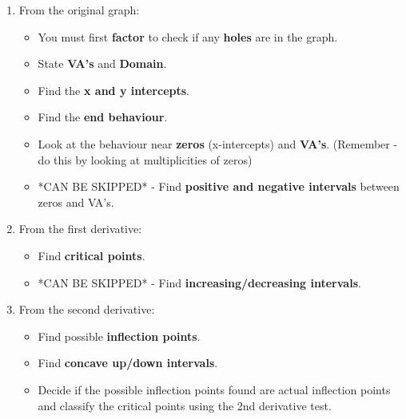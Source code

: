 \documentclass[12pt,fleqn]{book} %
\begin{document}
\begin{enumerate}
    \item From the original graph:
          \begin{itemize}
              \item You must first \textbf{factor} to check if any \textbf{holes} are in the graph.
              \item State \textbf{VA's} and \textbf{Domain}.
              \item Find the \textbf{x and y intercepts}.
              \item Find the \textbf{end behaviour}.
              \item Look at the behaviour near \textbf{zeros} (x-intercepts) and \textbf{VA's}. (Remember - do this by looking at multiplicities of zeros)
              \item *CAN BE SKIPPED* - Find \textbf{positive and negative intervals} between zeros and VA's.
          \end{itemize}

          \vspace*{4mm}

    \item From the first derivative:
          \begin{itemize}
              \item Find \textbf{critical points}.
              \item *CAN BE SKIPPED* - Find \textbf{increasing/decreasing intervals}.
          \end{itemize}

          \vspace*{4mm}

    \item From the second derivative:
          \begin{itemize}
              \item Find possible \textbf{inflection points}.
              \item Find \textbf{concave up/down intervals}.
              \item Decide if the possible inflection points found are actual inflection points and classify the critical points using the 2nd derivative test.
          \end{itemize}
\end{enumerate}

\pagebreak


\vspace*{2mm}
\end{document}
